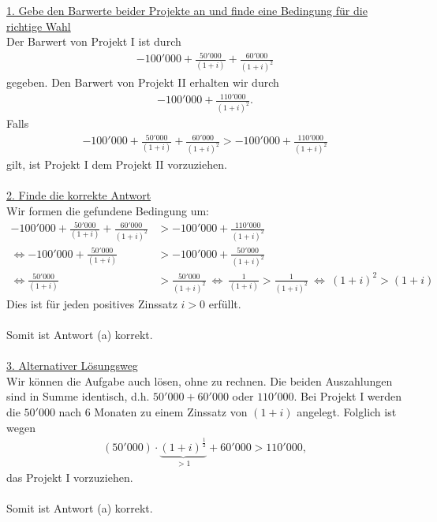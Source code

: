 \underline{1. Gebe den Barwerte beider Projekte an und finde eine Bedingung für die richtige Wahl}\\
Der Barwert von Projekt I ist durch
\begin{align*}
-100'000 + \frac{50'000}{(1+i)} + \frac{60'000}{(1+i)^2}
\end{align*}
gegeben. Den Barwert von Projekt II erhalten wir durch
\begin{align*}
-100'000 + \frac{110'000}{(1+i)^2}.
\end{align*}
Falls
\begin{align*}
-100'000 + \frac{50'000}{(1+i)} + \frac{60'000}{(1+i)^2}
>
-100'000 + \frac{110'000}{(1+i)^2}
\end{align*}
gilt, ist Projekt I dem Projekt II vorzuziehen.
\\
\\
\underline{2. Finde die korrekte Antwort}\\
Wir formen die gefundene Bedingung um:
\begin{align*}
-100'000 + \frac{50'000}{(1+i)} + \frac{60'000}{(1+i)^2}
&>
-100'000 + \frac{110'000}{(1+i)^2}
\\
\Leftrightarrow
-100'000 + \frac{50'000}{(1+i)}
&> -100'000 + \frac{50'000}{(1+i)^2}\\
 \Leftrightarrow 
\frac{50'000}{(1+i)} &> 
\frac{50'000}{(1+i)^2}
\ \Leftrightarrow \ 
\frac{1}{(1+i)} > \frac{1}{(1+i)^2}
 \ \Leftrightarrow \
(1+i)^2 > (1+i)
\end{align*}
Dies ist für jeden positives Zinssatz $ i > 0  $ erfüllt.\\
\\
Somit ist Antwort (a) korrekt.
\\
\\
\underline{3. Alternativer Lösungsweg}\\
Wir können die Aufgabe auch lösen, ohne zu rechnen.
Die beiden Auszahlungen sind in Summe identisch, d.h.
$ 50'000 + 60'000 $ oder $ 110'000 $.
Bei Projekt I werden die $ 50'000 $ nach $ 6 $ Monaten zu einem Zinssatz von $ (1 + i) $ angelegt.
Folglich ist wegen
\begin{align*}
(50'000) \cdot \underbrace{(1+i)^{\frac{1}{2}}}_{> 1} + 60'000 
> 110'000,
\end{align*}
das Projekt I vorzuziehen.\\
\\
Somit ist Antwort (a) korrekt.
\newpage


